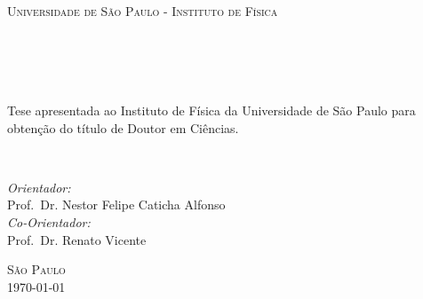 \begin{titlepage}
\begin{fullwidth}
\begin{center}


\textsc{\LARGE Universidade de São Paulo - Instituto de Física}\\[3cm]

\HRule \\[0.4cm]
\textsc{\textit{\titlefont {\titletext}\\[1.0cm] \subtitlefont {\subtitletext}}}
\HRule\\[2.2cm]
\textsc{\LARGE \authorinfo }\\[1.5cm]
\hfill\begin{minipage}{0.7\textwidth}
\Large
Tese apresentada ao Instituto de Física da Universidade de São Paulo para obtenção do título de Doutor em Ciências. 
\end{minipage}\\[1.cm]
\hfill\begin{minipage}{0.7\textwidth}
\Large

\emph{Orientador:} \\
Prof.~Dr. Nestor Felipe Caticha Alfonso\\

\emph{Co-Orientador:} \\
Prof.~Dr. Renato Vicente
\end{minipage}
\vfill

\textsc{\LARGE São Paulo}\\
\textsc{\LARGE \today}

\end{center}
\end{fullwidth}
\end{titlepage}